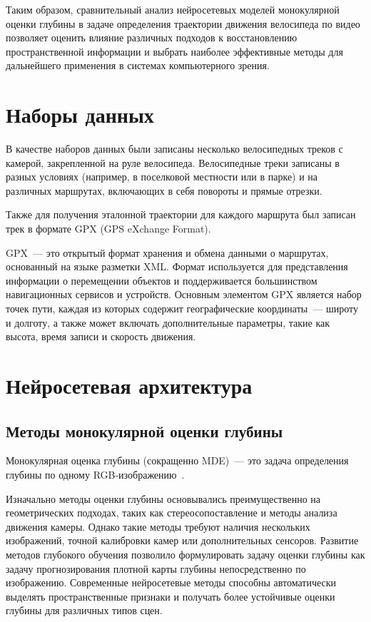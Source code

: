 \documentclass{misisarticle}
\begin{document}
Таким образом, сравнительный анализ нейросетевых моделей монокулярной оценки глубины в задаче определения траектории движения велосипеда по видео позволяет оценить влияние различных подходов к восстановлению пространственной информации и выбрать наиболее эффективные методы для дальнейшего применения в системах компьютерного зрения.

\section{Наборы данных}

В качестве наборов данных были записаны несколько велосипедных треков с камерой, закрепленной на руле велосипеда. Велосипедные треки записаны в разных условиях (например, в поселковой местности или в парке) и на различных маршрутах, включающих в себя повороты и прямые отрезки.

Также для получения эталонной траектории для каждого маршрута был записан трек в формате GPX (GPS eXchange Format).

GPX~--- это открытый формат хранения и обмена данными о маршрутах, основанный на языке разметки XML. Формат используется для представления информации о перемещении объектов и поддерживается большинством навигационных сервисов и устройств. Основным элементом GPX является набор точек пути, каждая из которых содержит географические координаты~--- широту и долготу, а также может включать дополнительные параметры, такие как высота, время записи и скорость движения.

\section{Нейросетевая архитектура}

\subsection{Методы монокулярной оценки глубины}

Монокулярная оценка глубины (сокращенно MDE)~--- это задача определения глубины по одному RGB-изображению~\cite{ref2}.

Изначально методы оценки глубины основывались преимущественно на геометрических подходах, таких как стереосопоставление и методы анализа движения камеры. Однако такие методы требуют наличия нескольких изображений, точной калибровки камер или дополнительных сенсоров. Развитие методов глубокого обучения позволило формулировать задачу оценки глубины как задачу прогнозирования плотной карты глубины непосредственно по изображению. Современные нейросетевые методы способны автоматически выделять пространственные признаки и получать более устойчивые оценки глубины для различных типов сцен.
\end{document}
